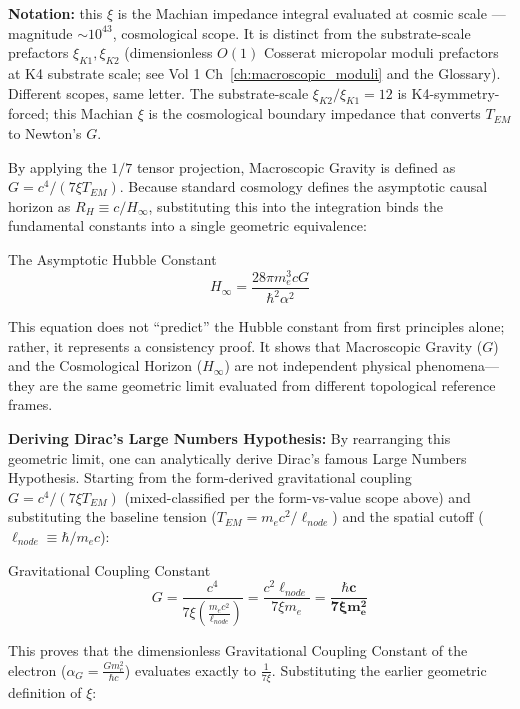 \textbf{Notation:} this $\xi$ is the Machian impedance integral evaluated at
cosmic scale --- magnitude $\sim 10^{43}$, cosmological scope. It is distinct
from the substrate-scale prefactors $\xi_{K1}, \xi_{K2}$ (dimensionless $O(1)$
Cosserat micropolar moduli prefactors at K4 substrate scale; see Vol 1
Ch~\ref{ch:macroscopic_moduli} and the Glossary). Different scopes, same
letter. The substrate-scale $\xi_{K2}/\xi_{K1} = 12$ is K4-symmetry-forced;
this Machian $\xi$ is the cosmological boundary impedance that converts
$T_{EM}$ to Newton's $G$.

By applying the $1/7$ tensor projection, Macroscopic Gravity is defined as $G=c^{4}/(7\xi T_{EM})$. Because standard cosmology defines the asymptotic causal horizon as $R_{H}\equiv c/H_{\infty}$, substituting this into the integration binds the fundamental constants into a single geometric equivalence:

\begin{resultbox}{The Asymptotic Hubble Constant}
\begin{equation}
H_{\infty}=\frac{28\pi m_{e}^{3}cG}{\hbar^{2}\alpha^{2}}
\end{equation}
\end{resultbox}

This equation does not ``predict'' the Hubble constant from first principles alone; rather, it represents a consistency proof. It shows that Macroscopic Gravity ($G$) and the Cosmological Horizon ($H_{\infty}$) are not independent physical phenomena---they are the same geometric limit evaluated from different topological reference frames.

\textbf{Deriving Dirac's Large Numbers Hypothesis:} By rearranging this geometric limit, one can analytically derive Dirac's famous Large Numbers Hypothesis. Starting from the form-derived gravitational coupling $G=c^{4}/(7\xi T_{EM})$ (mixed-classified per the form-vs-value scope above) and substituting the baseline tension ($T_{EM}=m_{e}c^{2}/\ell_{node}$) and the spatial cutoff ($\ell_{node}\equiv\hbar/m_{e}c$):

\begin{resultbox}{Gravitational Coupling Constant}
\begin{equation}
G=\frac{c^{4}}{7\xi\left(\frac{m_{e}c^{2}}{\ell_{node}}\right)}=\frac{c^{2}\ell_{node}}{7\xi m_{e}}=\mathbf{\frac{\hbar c}{7\xi m_{e}^{2}}}
\end{equation}
\end{resultbox}

This proves that the dimensionless Gravitational Coupling Constant of the electron ($\alpha_{G}=\frac{Gm_{e}^{2}}{\hbar c}$) evaluates exactly to $\frac{1}{7\xi}$. Substituting the earlier geometric definition of $\xi$:

